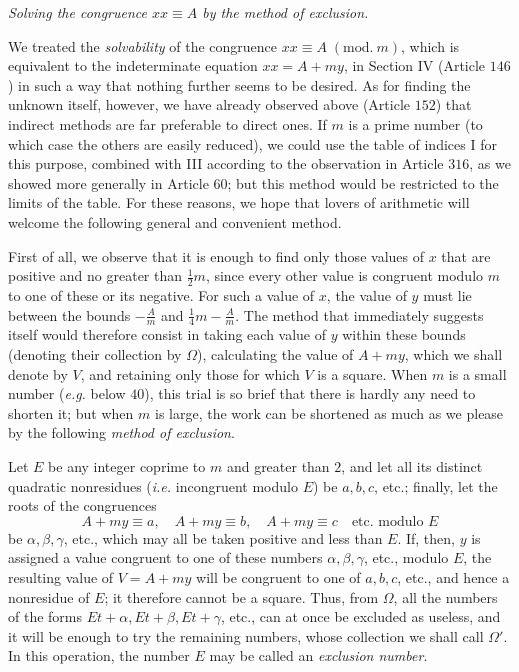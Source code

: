 \begin{center}\textit{Solving the congruence \(xx\equiv A\) by the method of exclusion.}\end{center}


We treated the \textit{solvability} of the congruence \(xx\equiv A\; (\mathrm{mod}.\ m)\), which is equivalent to the indeterminate equation \(xx=A+my\), in Section IV (Article \(146\)) in such a way that nothing further seems to be desired. As for finding the unknown itself, however, we have already observed above (Article \(152\)) that indirect methods are far preferable to direct ones. If \(m\) is a prime number (to which case the others are easily reduced), we could use the table of indices I for this purpose, combined with III according to the observation in Article \(316\), as we showed more generally in Article \(60\); but this method would be restricted to the limits of the table. For these reasons, we hope that lovers of arithmetic will welcome the following general and convenient method.

First of all, we observe that it is enough to find only those values of \(x\) that are positive and no greater than \(\frac12m\), since every other value is congruent modulo \(m\) to one of these or its negative. For such a value of \(x\), the value of \(y\) must lie between the bounds \(-\frac Am\) and \(\frac14m-\frac Am\). The method that immediately suggests itself would therefore consist in taking each value of \(y\) within these bounds (denoting their collection by \(\Omega\)), calculating the value of \(A+my\), which we shall denote by \(V\), and retaining only those for which \(V\) is a square. When \(m\) is a small number (\textit{e.g.} below \(40\)), this trial is so brief that there is hardly any need to shorten it; but when \(m\) is large, the work can be shortened as much as we please by the following \textit{method of exclusion}.

Let \(E\) be any integer coprime to \(m\) and greater than \(2\), and let all its distinct quadratic nonresidues (\textit{i.e.} incongruent modulo \(E\)) be \(a,\allowbreak b,\allowbreak c\), etc.;
finally, let the roots of the congruences
\[A+my\equiv a,\quad A+my\equiv b,\quad A+my\equiv c\quad\text{etc. modulo }E\]
be \(\alpha,\allowbreak \beta,\allowbreak \gamma\), etc., which may all be taken positive and less than \(E\). If, then, \(y\) is assigned a value congruent to one of these numbers \(\alpha,\allowbreak \beta,\allowbreak \gamma\), etc., modulo \(E\), the resulting value of \(V=A+my\) will be congruent to one of \(a,\allowbreak b,\allowbreak c\), etc., and hence a nonresidue of \(E\); it therefore cannot be a square. Thus, from \(\Omega\), all the numbers of the forms \(Et+\alpha,\allowbreak Et+\beta,\allowbreak Et+\gamma\), etc., can at once be excluded as useless, and it will be enough to try the remaining numbers, whose collection we shall call \(\Omega'\). In this operation, the number \(E\) may be called an \textit{exclusion number}.

